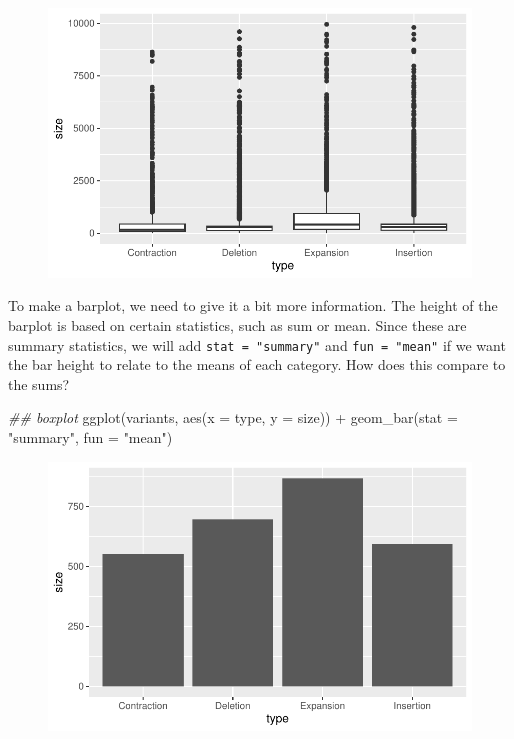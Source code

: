 \documentclass[
  letterpaper,
  DIV=11,
  numbers=noendperiod]{scrreprt}
\newenvironment{Shaded}{\begin{snugshade}}{\end{snugshade}}
\newcommand{\AttributeTok}[1]{\textcolor[rgb]{0.40,0.45,0.13}{#1}}
\newcommand{\DocumentationTok}[1]{\textcolor[rgb]{0.37,0.37,0.37}{\textit{#1}}}
\newcommand{\FunctionTok}[1]{\textcolor[rgb]{0.28,0.35,0.67}{#1}}
\newcommand{\NormalTok}[1]{\textcolor[rgb]{0.00,0.23,0.31}{#1}}
\newcommand{\SpecialCharTok}[1]{\textcolor[rgb]{0.37,0.37,0.37}{#1}}
\newcommand{\StringTok}[1]{\textcolor[rgb]{0.13,0.47,0.30}{#1}}
\begin{document}
\begin{figure}[H]

{\centering \includegraphics{scripts/02_dataViz/class3_files/figure-pdf/unnamed-chunk-19-1.pdf}

}

\end{figure}

To make a barplot, we need to give it a bit more information. The height
of the barplot is based on certain statistics, such as sum or mean.
Since these are summary statistics, we will add
\texttt{stat\ =\ "summary"} and \texttt{fun\ =\ "mean"} if we want the
bar height to relate to the means of each category. How does this
compare to the sums?

\begin{Shaded}
\begin{Highlighting}[]
\DocumentationTok{\#\# boxplot}
\FunctionTok{ggplot}\NormalTok{(variants, }\FunctionTok{aes}\NormalTok{(}\AttributeTok{x =}\NormalTok{ type, }\AttributeTok{y =}\NormalTok{ size)) }\SpecialCharTok{+}
  \FunctionTok{geom\_bar}\NormalTok{(}\AttributeTok{stat =} \StringTok{"summary"}\NormalTok{, }\AttributeTok{fun =} \StringTok{"mean"}\NormalTok{)}
\end{Highlighting}
\end{Shaded}

\begin{figure}[H]

{\centering \includegraphics{scripts/02_dataViz/class3_files/figure-pdf/unnamed-chunk-20-1.pdf}

}

\end{figure}
\end{document}
